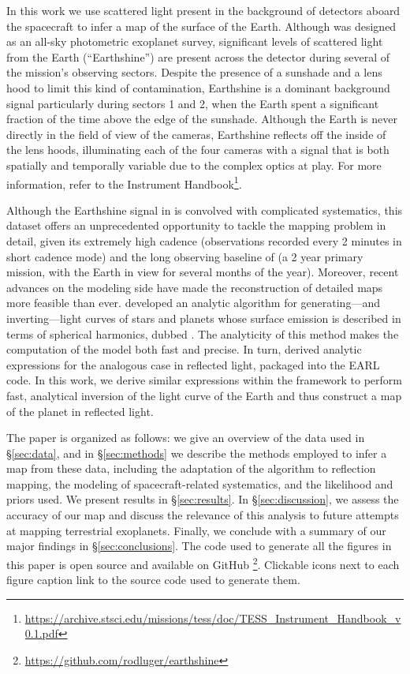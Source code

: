 \documentclass[modern]{aastex62}
\begin{document}
In this work we use scattered light present in the background of
detectors aboard the \TESS spacecraft to infer a map of the surface of the Earth.
Although \TESS was designed as an all-sky photometric exoplanet survey,
significant levels of
scattered light from the Earth (``Earthshine'') are present across the \TESS detector
during several of the mission's observing sectors. Despite the presence
of a sunshade and a lens hood to limit this kind of contamination,
Earthshine is a dominant background signal particularly during
sectors 1 and 2, when the Earth spent a significant fraction of the
time above the edge of the \TESS sunshade. Although the Earth is never
directly in the field of view of the \TESS cameras, Earthshine reflects 
off the inside of the lens hoods, illuminating each of the four cameras
with a signal that is both spatially and temporally variable due to 
the complex optics at play. For more information, refer to the
\TESS Instrument Handbook\footnote{\url{https://archive.stsci.edu/missions/tess/doc/TESS_Instrument_Handbook_v0.1.pdf}}.

Although the Earthshine signal in \TESS is convolved with complicated systematics,
this dataset offers an unprecedented opportunity to tackle the mapping problem in detail, given
its extremely high cadence (observations recorded every 2 minutes in short cadence mode) 
and the long observing baseline of \TESS (a 2 year primary mission, with the Earth in view
for several months of the year).
%
Moreover, recent advances on the modeling side 
have made the reconstruction of detailed maps more feasible than ever. 
\cite{Luger2019} developed an analytic algorithm for generating---and
inverting---light curves of stars and planets whose surface emission is
described in terms of spherical harmonics, dubbed \starry. The analyticity of this
method makes the computation of the model both fast and precise.
In turn, \cite{Haggard2018} derived analytic expressions for the
analogous case in reflected light, packaged into the 
\textsf{EARL} code. In this work, we derive similar expressions within
the \starry framework to perform fast, analytical inversion of the light curve
of the Earth and thus construct a map of the planet in reflected light.

The paper is organized as follows: we give an overview of the \TESS data used in \S\ref{sec:data},
and in \S\ref{sec:methods} we describe the methods employed to infer a map 
from these data, including the adaptation of the \starry algorithm to reflection 
mapping, the modeling of spacecraft-related systematics, and the likelihood and 
priors used. 
We present results in \S\ref{sec:results}. 
In \S\ref{sec:discussion}, we assess the accuracy of our map and discuss the relevance 
of this analysis to future attempts at mapping terrestrial exoplanets.
Finally, we conclude with a summary of our major findings in \S\ref{sec:conclusions}.
The code used to generate all the figures in this paper is open source
and available on GitHub%
\footnote{\url{https://github.com/rodluger/earthshine}}. Clickable icons
\href{https://github.com/rodluger/earthshine}{\color{linkcolor}\faFileCodeO}
next to each figure caption 
link to the source code used to generate them.
\end{document}
